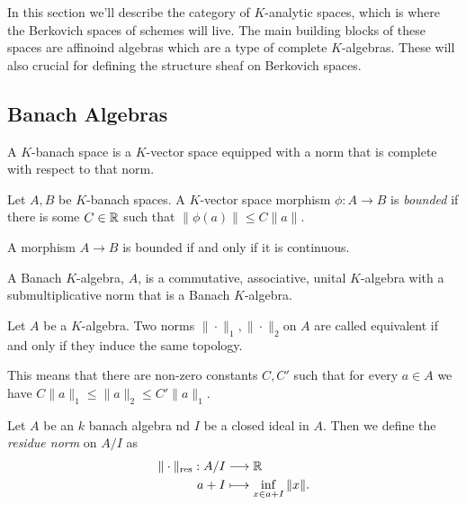 
In this section we'll describe the category of $K$-analytic spaces, which is where the Berkovich spaces of schemes will live. 
The main building blocks of these spaces are affinoind algebras which are a type of complete $K$-algebras. 
These will also crucial for defining the structure sheaf on Berkovich spaces. 

\subsection{Banach Algebras} \label{sec:banach_algebras}
\begin{definition}
	A $K$-banach space is a $K$-vector space equipped with a norm that is complete with respect to that norm. 
\end{definition}

\begin{definition}
	Let $A, B$ be $K$-banach spaces. 
	A $K$-vector space morphism $\phi: A \to B$ is \emph{bounded} if there is some $C\in \mathbb{R}$ such that $\|\phi(a)\|\le C \|a\| $. 
\end{definition}

\begin{lemma}
	A morphism $A \to B$ is bounded if and only if it is continuous. 
\end{lemma}

\begin{definition}
	A Banach $K$-algebra, $A$, is a commutative, associative, unital $K$-algebra with a submultiplicative norm that is a Banach $K$-algebra.
\end{definition}
\begin{definition}
	Let $A$ be a $K$-algebra. 
	Two norms $\|\cdot \|_1, \|\cdot \|_2$on $A$ are called equivalent if and only if they induce the same topology. 

	This means that there are non-zero constants $C, C'$ such that for every $ a\in A$ we have $C\|a\|_1 \le \|a\|_2 \le C'\|a\|_1$. 
\end{definition}

\begin{definition}
	Let $A$ be an $k$ banach algebra nd $I$ be a closed ideal in $A$. 
	Then we define the \emph{residue norm} on $A / I$ as 
	\begin{align*}
		\|\cdot \|_\text{res} : A / I &\longrightarrow \mathbb{R} \\
		a + I &\longmapsto \inf_{x \in a + I} \|x\|
	.\end{align*}
\end{definition}

